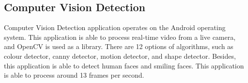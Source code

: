         \subsection{Computer Vision Detection}
            Computer Vision Detection application operates on the Android operating system.
            This application is able to process real-time video from a live camera,
            and OpenCV is used as a library.
            There are 12 options of algorithms, such as colour detector, canny detector, motion detector, and shape detector.
            Besides, this application is able to detect human faces and smiling faces.
            This application is able to process around 13 frames per second.
